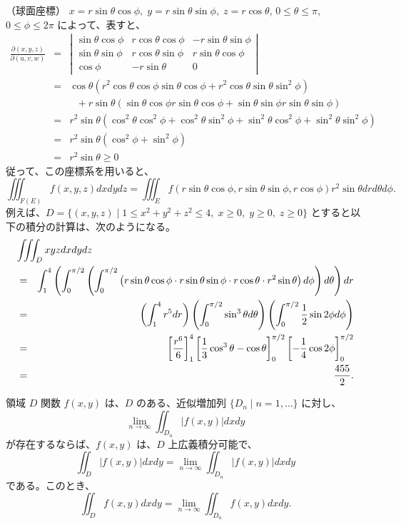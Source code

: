 \begin{eg} 
\label{eg:polar3}
（球面座標）
$x = r\sin\theta\cos\phi, \;y = r\sin\theta\sin\phi,\;z = r\cos\theta$, $0\leq \theta \leq\pi$, 
$0\leq \phi \leq 2\pi$ によって、表すと、
\begin{eqnarray*}
\frac{\partial(x,y,z)}{\partial(u,v,w)}
& = & \left|\begin{array}{ccc}
\sin\theta\cos\phi & r\cos\theta\cos\phi & -r\sin\theta\sin\phi\\
\sin\theta\sin\phi & r\cos\theta\sin\phi & r\sin\theta\cos\phi\\
\cos\phi & -r\sin\theta & 0
\end{array}\right|\\
& = & \cos\theta(r^2\cos\theta\cos\phi\sin\theta\cos\phi + r^2\cos\theta\sin\theta\sin^2\phi)\\
& & \mbox{ }+ r\sin\theta(\sin\theta\cos\phi r\sin\theta\cos\phi + \sin\theta\sin\phi r\sin\theta\sin\phi)\\
& = & r^2\sin\theta(\cos^2\theta\cos^2\phi + \cos^2\theta\sin^2\phi + \sin^2\theta\cos^2\phi + \sin^2\theta\sin^2\phi)\\
& = & r^2\sin\theta(\cos^2\phi+\sin^2\phi)\\
& = & r^2\sin\theta \geq 0
\end{eqnarray*}
従って、この座標系を用いると、
$$\iiint_{F(E)}f(x,y,z)dxdydz = \iiint_Ef(r\sin\theta\cos\phi,r\sin\theta\sin\phi,r\cos\phi)r^2\sin\theta  drd\theta d\phi.$$
例えば、$D = \{(x,y,z)\mid 1\leq x^2+y^2 + z^2 \leq 4,\;x\geq 0, \;y\geq 0,\;z\geq 0\}$ とすると以下の積分の計算は、次のようになる。
\begin{eqnarray*}
\lefteqn{\iiint_D xyzdxdydz}\\
& = & \int_1^4\left(\int_0^{\pi/2}\left(\int_0^{\pi/2} \left(r\sin\theta\cos\phi\cdot r\sin\theta\sin\phi\cdot r\cos\theta\cdot r^2\sin\theta\right)d\phi\right)d\theta\right)dr\\
& = & \left(\int_1^4r^5dr\right)\left(\int_0^{\pi/2}\sin^3\theta d\theta\right)\left(\int_0^{\pi/2}\frac12\sin 2\phi d\phi\right)\\
& = & \left[\frac{r^6}6\right]_1^4\left[\frac{1}{3}\cos^3\theta - \cos\theta\right]_0^{\pi/2}\left[-\frac14\cos2\phi\right]_0^{\pi/2}\\
& = & \frac{455}{2}.
\end{eqnarray*}
\end{eg}

\begin{thm}
領域 $D$ 関数 $f(x,y)$ は、$D$ のある、近似増加列 $\{D_n\mid n = 1,\ldots \}$ に対し、
$$\lim_{n\to\infty}\iint_{D_n}|f(x,y)|dxdy$$
が存在するならば、$f(x,y)$ は、$D$ 上広義積分可能で、
$$\iint_{D}|f(x,y)|dxdy = \lim_{n\to\infty}\iint_{D_n}|f(x,y)|dxdy$$
である。このとき、
$$\iint_{D}f(x,y)dxdy = \lim_{n\to\infty}\iint_{D_n}f(x,y)dxdy.$$
\end{thm}

